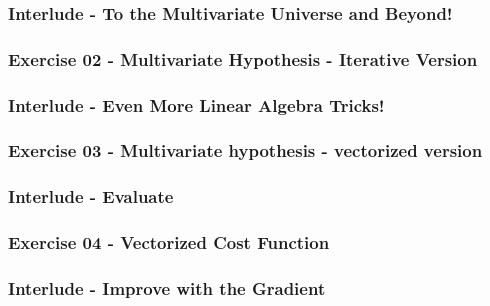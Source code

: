 \documentclass[]{article}
\begin{document}
\hypertarget{interlude---to-the-multivariate-universe-and-beyond}{%
\subsubsection{Interlude - To the Multivariate Universe and
Beyond!}\label{interlude---to-the-multivariate-universe-and-beyond}}

\hypertarget{exercise-02---multivariate-hypothesis---iterative-version}{%
\subsubsection{Exercise 02 - Multivariate Hypothesis - Iterative
Version}\label{exercise-02---multivariate-hypothesis---iterative-version}}

\hypertarget{interlude---even-more-linear-algebra-tricks}{%
\subsubsection{Interlude - Even More Linear Algebra
Tricks!}\label{interlude---even-more-linear-algebra-tricks}}

\hypertarget{exercise-03---multivariate-hypothesis---vectorized-version}{%
\subsubsection{Exercise 03 - Multivariate hypothesis - vectorized
version}\label{exercise-03---multivariate-hypothesis---vectorized-version}}

\hypertarget{interlude---evaluate}{%
\subsubsection{Interlude - Evaluate}\label{interlude---evaluate}}

\hypertarget{exercise-04---vectorized-cost-function}{%
\subsubsection{Exercise 04 - Vectorized Cost
Function}\label{exercise-04---vectorized-cost-function}}

\hypertarget{interlude---improve-with-the-gradient}{%
\subsubsection{Interlude - Improve with the
Gradient}\label{interlude---improve-with-the-gradient}}
\end{document}
